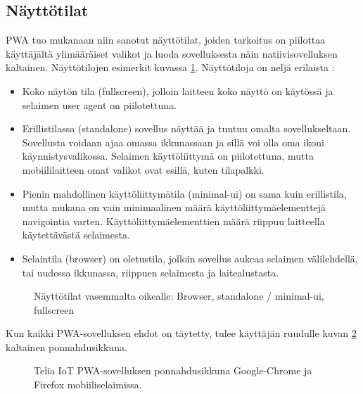 \documentclass{tktltiki}
\begin{document}
\subsection{Näyttötilat}

PWA tuo mukanaan niin sanotut näyttötilat, joiden tarkoitus on piilottaa käyttäjältä ylimääräiset valikot ja luoda sovelluksesta näin natiivisovelluksen kaltainen. Näyttötilojen esimerkit kuvassa \ref{Näyttötilat}. Näyttötiloja on neljä erilaista \cite{Mozilla}:

\begin{itemize}
  \item Koko näytön tila (fullscreen), jolloin laitteen koko näyttö on käytössä ja selaimen user agent on piilotettuna.
  \item Erillistilassa (standalone) sovellus näyttää ja tuntuu omalta sovellukseltaan. Sovellusta voidaan ajaa omassa ikkunassaan ja sillä voi olla oma ikoni käynnistysvalikossa. Selaimen käyttöliittymä on piilotettuna, mutta mobiililaitteen omat valikot ovat esillä, kuten tilapalkki. 
  \item Pienin mahdollinen käyttöliittymätila (minimal-ui) on sama kuin erillistila, mutta mukana on vain minimaalinen määrä käyttöliittymäelementtejä navigointia varten. Käyttöliittymäelementtien määrä riippuu laitteella käytettävästä selaimesta. 
  \item Selaintila (browser) on oletustila, jolloin sovellus aukeaa selaimen välilehdellä, tai uudessa ikkunassa, riippuen selaimesta ja laitealustasta. 
\end{itemize}

\begin{figure}[h]
\begin{center}
\caption{Näyttötilat vasemmalta oikealle: Browser, standalone / minimal-ui, fullscreen}
\label{Näyttötilat}
\end{center}
\end{figure}

Kun kaikki PWA-sovelluksen ehdot on täytetty, tulee käyttäjän ruudulle kuvan \ref{asennusbanneri} kaltainen ponnahdusikkuna.

\begin{figure}[h]
\begin{center}
\caption{Telia IoT PWA-sovelluksen ponnahdusikkuna Google-Chrome ja Firefox mobiiliselaimissa.}
\label{asennusbanneri}
\end{center}
\end{figure}
\end{document}
